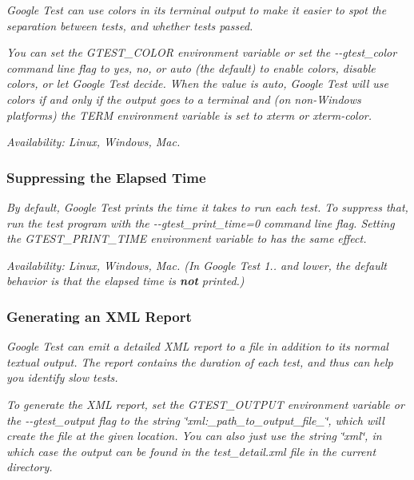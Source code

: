 {\itshape }

{\itshape Google Test can use colors in its terminal output to make it easier to spot the separation between tests, and whether tests passed.}

{\itshape You can set the G\+T\+E\+S\+T\+\_\+\+C\+O\+L\+OR environment variable or set the {\ttfamily -\/-\/gtest\+\_\+color} command line flag to {\ttfamily yes}, {\ttfamily no}, or {\ttfamily auto} (the default) to enable colors, disable colors, or let Google Test decide. When the value is {\ttfamily auto}, Google Test will use colors if and only if the output goes to a terminal and (on non-\/\+Windows platforms) the {\ttfamily T\+E\+RM} environment variable is set to {\ttfamily xterm} or {\ttfamily xterm-\/color}.}

{\itshape {\itshape Availability\+:} Linux, Windows, Mac.}

{\itshape \subsubsection*{Suppressing the Elapsed Time}}

{\itshape }

{\itshape By default, Google Test prints the time it takes to run each test. To suppress that, run the test program with the {\ttfamily -\/-\/gtest\+\_\+print\+\_\+time=0} command line flag. Setting the {\ttfamily G\+T\+E\+S\+T\+\_\+\+P\+R\+I\+N\+T\+\_\+\+T\+I\+ME} environment variable to {} has the same effect.}

{\itshape {\itshape Availability\+:} Linux, Windows, Mac. (In Google Test 1.. and lower, the default behavior is that the elapsed time is {\bfseries{not}} printed.)}

{\itshape \subsubsection*{Generating an X\+ML Report}}

{\itshape }

{\itshape Google Test can emit a detailed X\+ML report to a file in addition to its normal textual output. The report contains the duration of each test, and thus can help you identify slow tests.}

{\itshape To generate the X\+ML report, set the {\ttfamily G\+T\+E\+S\+T\+\_\+\+O\+U\+T\+P\+UT} environment variable or the {\ttfamily -\/-\/gtest\+\_\+output} flag to the string {\ttfamily \char`\"{}xml\+:\+\_\+path\+\_\+to\+\_\+output\+\_\+file\+\_\+\char`\"{}}, which will create the file at the given location. You can also just use the string {\ttfamily \char`\"{}xml\char`\"{}}, in which case the output can be found in the {\ttfamily test\+\_\+detail.\+xml} file in the current directory.}

